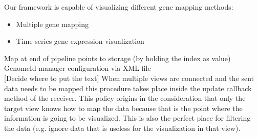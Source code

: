 Our framework is capable of visualizing different gene mapping methods:
\begin{itemize}
 \item Multiple gene mapping
 \item Time series gene-expression visualization
\end{itemize} 

Map at end of pipeline points to storage (by holding the index as value)\\
GenomeId manager configuration via XML file\\

[Decide where to put the text]
When multiple views are connected and the sent data needs to be mapped this procedure takes place inside the update callback method of the receiver. This policy origins in the consideration that only the target view knows how to map the data because that is the point where the information is going to be visualized. This is also the perfect place for filtering the data (e.g. ignore data that is useless for the visualization in that view).